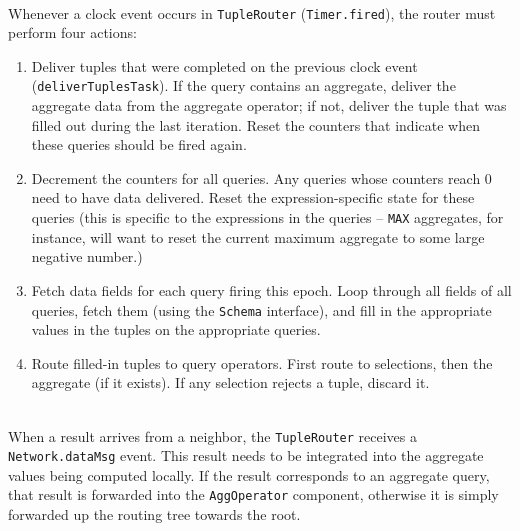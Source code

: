 \documentclass[11pt]{article}
\begin{document}
\vspace{1em}
\\
Whenever a clock event occurs in {\tt TupleRouter} ({\tt Timer.fired}), the
  router must perform four actions:
\begin{enumerate}

\item Deliver tuples that were completed on the previous clock event
  ({\tt deliverTuplesTask}).  If the query contains an aggregate,
  deliver the aggregate data from the aggregate operator;  if not,
  deliver the tuple that was filled out during the last
  iteration. Reset the counters that  indicate when these queries
  should be fired again.
  
\item Decrement the counters for all queries.  Any queries whose
  counters reach 0 need to have data delivered.  Reset the
  expression-specific state for these queries (this is specific
  to the expressions in the queries -- {\tt MAX} aggregates, for instance,
  will want to reset the current maximum aggregate to some large
  negative number.)

\item Fetch data fields for each query firing this epoch.  Loop
  through all fields of all queries, fetch them (using the {\tt Schema}
  interface), and fill in the appropriate values in the tuples
  on the appropriate queries.  
  
\item Route filled-in tuples to query operators.  First route to
  selections, then the aggregate (if it exists).  If any selection
  rejects a tuple, discard it.

\end{enumerate}

\vspace{1em}
\\
  When a result arrives from a neighbor, the {\tt TupleRouter} receives a {\tt Network.dataMsg} event.
  This result needs to be integrated into the aggregate values being computed
  locally.  If the result corresponds to an aggregate query, that result
  is forwarded into the {\tt AggOperator} component, otherwise it is 
  simply forwarded up the routing tree towards the root.
\end{document}
